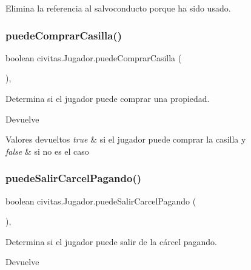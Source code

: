 Elimina la referencia al salvoconducto porque ha sido usado. \mbox{\label{classcivitas_1_1Jugador_acfcfe8a5b5d26b2293cc727cd27acfac}} 
\subsubsection{\texorpdfstring{puede\+Comprar\+Casilla()}{puedeComprarCasilla()}}
{\footnotesize\ttfamily boolean civitas.\+Jugador.\+puede\+Comprar\+Casilla (\begin{DoxyParamCaption}{ }\end{DoxyParamCaption})\hspace{0.3cm}{\ttfamily [inline]}, {\ttfamily [package]}}

Determina si el jugador puede comprar una propiedad. \begin{DoxyReturn}{Devuelve}

\end{DoxyReturn}

\begin{DoxyRetVals}{Valores devueltos}
{\em true} & si el jugador puede comprar la casilla y \\
\hline
{\em false} & si no es el caso \\
\hline
\end{DoxyRetVals}
\mbox{\label{classcivitas_1_1Jugador_a4a001e328396bc37afa704a71a0f236f}} 
\subsubsection{\texorpdfstring{puede\+Salir\+Carcel\+Pagando()}{puedeSalirCarcelPagando()}}
{\footnotesize\ttfamily boolean civitas.\+Jugador.\+puede\+Salir\+Carcel\+Pagando (\begin{DoxyParamCaption}{ }\end{DoxyParamCaption})\hspace{0.3cm}{\ttfamily [inline]}, {\ttfamily [private]}}

Determina si el jugador puede salir de la cárcel pagando. \begin{DoxyReturn}{Devuelve}

\end{DoxyReturn}

